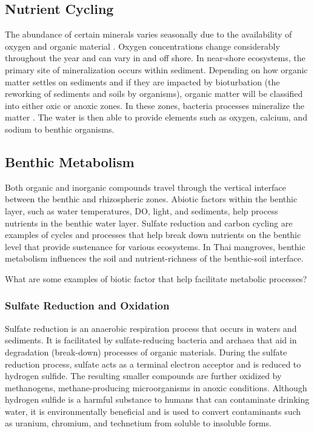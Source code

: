 \subsection{Nutrient Cycling}

The abundance of certain minerals varies seasonally due to the availability of oxygen and organic material \citep{friedrich2002benthic}. Oxygen concentrations change considerably throughout the year and can vary in and off shore. In near-shore ecosystems, the primary site of mineralization occurs within sediment. Depending on how organic matter settles on sediments and if they are impacted by bioturbation (the reworking of sediments and soils by organisms), organic matter will be classified into either oxic or anoxic zones. In these zones, bacteria processes mineralize the matter \citep{spooner2009benthic}. The water is then able to provide elements such as oxygen, calcium, and sodium to benthic organisms.

\subsection{Benthic Metabolism}

Both organic and inorganic compounds travel through the vertical interface between the benthic and rhizospheric zones. Abiotic factors within the benthic layer, such as water temperatures, DO, light, and sediments, help process nutrients in the benthic water layer. Sulfate reduction and carbon cycling are examples of cycles and processes that help break down nutrients on the benthic level that provide sustenance for various ecosystems. In Thai mangroves, benthic metabolism influences the soil and nutrient-richness of the benthic-soil interface.

\begin{exercise}
What are some examples of biotic factor that help facilitate metabolic processes?
\end{exercise}

\subsubsection{Sulfate Reduction and Oxidation}

Sulfate reduction is an anaerobic respiration process that occurs in waters and sediments. It is facilitated by sulfate-reducing bacteria and archaea that aid in degradation (break-down) processes of organic materials. During the sulfate reduction process, sulfate acts as a terminal electron acceptor and is reduced to hydrogen sulfide. The resulting smaller compounds are further oxidized by methanogens, methane-producing microorganisms in anoxic conditions. Although hydrogen sulfide is a harmful substance to humans that can contaminate drinking water, it is environmentally beneficial and is used to convert contaminants such as uranium, chromium, and technetium from soluble to insoluble forms. 

